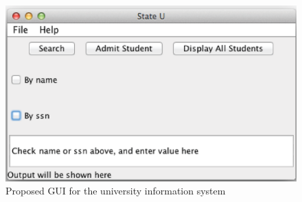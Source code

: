 

  
\begin {figure}

\includegraphics{figs/ch10/universityGUI.eps}

\caption {Proposed GUI for the university information system}

\label {fig:univGUI1}

\end {figure}


